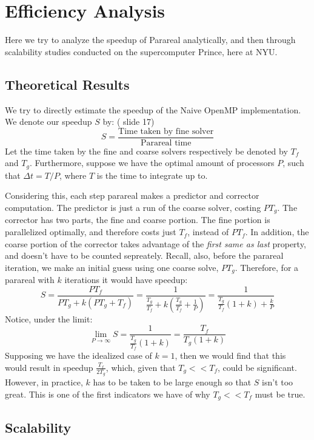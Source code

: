 \section{Efficiency Analysis}

Here we try to analyze the speedup of Parareal analytically, and then through
scalability studies conducted on the supercomputer Prince, here at NYU. 

\subsection{Theoretical Results}

We try to directly estimate the speedup of the Naive OpenMP implementation. We
denote our speedup $S$ by: (\cite{fieldstalk} slide 17)
\begin{equation*}
  S = \frac{\text{Time taken by fine solver}}{\text{Parareal time}}
\end{equation*}
Let the time taken by the fine and coarse solvers respectively be denoted by
$T_f$ and $T_g$. Furthermore, suppose we have the optimal amount of processors
$P$, such that $\Delta t = T/P$, where $T$ is the time to integrate up to.

Considering this, each step parareal makes a predictor and corrector
computation. The predictor is just a run of the coarse solver, costing $PT_g$.
The corrector has two parts, the fine and coarse portion. The fine portion is
parallelized optimally, and therefore costs just $T_f$, instead of $PT_f$.  In
addition, the coarse portion of the corrector takes advantage of the
\textit{first same as last} property, and doesn't have to be counted sepreately.
Recall, also, before the parareal iteration, we make an initial guess using one
coarse solve, $PT_g$. Therefore, for a parareal with $k$ iterations it would
have speedup:
\[
  S = \frac{PT_f}{PT_g + k(PT_g + T_f)} 
  = \frac{1}{\frac{T_g}{T_f} + k(\frac{T_g}{T_f} + \frac{1}{P})} 
  = \frac{1}{\frac{T_g}{T_f}(1+k) + \frac{k}{P}} 
\]
Notice, under the limit:
\[
  \lim_{P \to \infty} S = \frac{1}{\frac{T_g}{T_f}(1+k)} = \frac{T_f}{T_g(1+k)}
\]
Supposing we have the idealized case of $k = 1$, then we would find that this
would result in speedup $\frac{T_f}{2T_g}$, which, given that $T_g << T_f$,
could be significant. However, in practice, $k$ has to be taken to be large
enough so that $S$ isn't too great. This is one of the first indicators we have
of why $T_g << T_f$ must be true. 

\subsection{Scalability}


